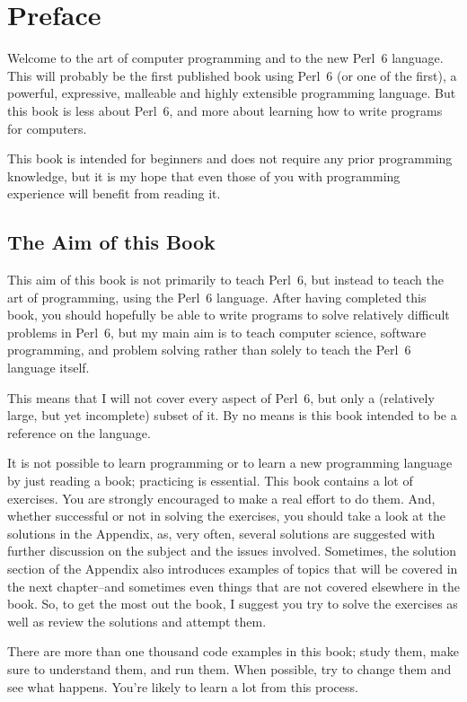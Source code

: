 
\chapter{Preface}

Welcome to the art of computer programming and to the 
new Perl~6 language. This will probably be 
the first published book using Perl~6 (or one of the first),
a powerful, expressive, malleable and highly extensible 
programming language. But this book is less 
about Perl~6, and more about learning 
how to write programs for computers. 

This book is intended for beginners and does not require 
any prior programming knowledge, but it is my hope 
that even those of you with programming experience will 
benefit from reading it.

\section*{The Aim of this Book}

This aim of this book is not primarily to teach Perl~6, 
but instead to teach the art 
of programming, using the Perl~6 language. After having 
completed this book, you should hopefully be able 
to write programs to solve relatively difficult problems in 
Perl~6, but my main aim is to teach computer science, software 
programming, and problem solving rather than solely to teach 
the Perl~6 language itself. 

This means that I will not cover every aspect of Perl~6, but 
only a (relatively large, but yet incomplete) subset of it. 
By no means is this book intended to be a reference on the 
language.

It is not possible to learn programming or to learn a new 
programming language by just reading a book; practicing 
is essential. This book contains a lot of exercises. You 
are strongly encouraged to make a real effort to do them. And, 
whether successful or not in solving the exercises, you 
should take a look at the solutions in the Appendix, 
as, very often, several solutions are suggested with further 
discussion on the subject and the issues involved. Sometimes, the solution 
section of the Appendix also introduces examples of topics 
that will be covered in the next chapter--and sometimes even 
things that are not covered elsewhere in the book. So, to get 
the most out the book, I suggest you try to solve the exercises 
as well as review the solutions and attempt them.

There are more than one thousand code examples in this book; 
study them, make sure to understand them, and run them. When 
possible, try to change them and see what happens. You're 
likely to learn a lot from this process.


